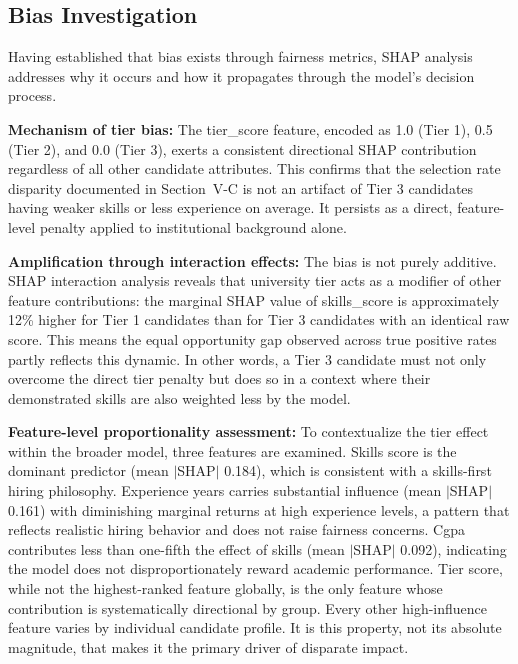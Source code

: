 \documentclass[conference]{IEEEtran}
\begin{document}
\subsection{Bias Investigation}

Having established that bias exists through fairness metrics, SHAP analysis addresses why it occurs and how it propagates through the model's decision process.

\textbf{Mechanism of tier bias:} The tier\_score feature, encoded as 1.0 (Tier 1), 0.5 (Tier 2), and 0.0 (Tier 3), exerts a consistent directional SHAP contribution regardless of all other candidate attributes. This confirms that the selection rate disparity documented in Section~V-C is not an artifact of Tier 3 candidates having weaker skills or less experience on average. It persists as a direct, feature-level penalty applied to institutional background alone.

\textbf{Amplification through interaction effects:} The bias is not purely additive. SHAP interaction analysis reveals that university tier acts as a modifier of other feature contributions: the marginal SHAP value of skills\_score is approximately 12\% higher for Tier 1 candidates than for Tier 3 candidates with an identical raw score. This means the equal opportunity gap observed across true positive rates partly reflects this dynamic. In other words, a Tier 3 candidate must not only overcome the direct tier penalty but does so in a context where their demonstrated skills are also weighted less by the model.

\textbf{Feature-level proportionality assessment:} To contextualize the tier effect within the broader model, three features are examined. Skills score is the dominant predictor (mean $|$SHAP$|$ 0.184), which is consistent with a skills-first hiring philosophy. Experience years carries substantial influence (mean $|$SHAP$|$ 0.161) with diminishing marginal returns at high experience levels, a pattern that reflects realistic hiring behavior and does not raise fairness concerns. Cgpa contributes less than one-fifth the effect of skills (mean $|$SHAP$|$ 0.092), indicating the model does not disproportionately reward academic performance. Tier score, while not the highest-ranked feature globally, is the only feature whose contribution is systematically directional by group. Every other high-influence feature varies by individual candidate profile. It is this property, not its absolute magnitude, that makes it the primary driver of disparate impact.
\end{document}
